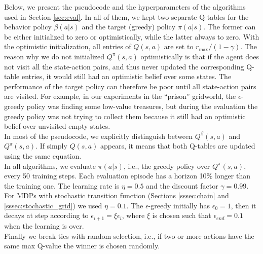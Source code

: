\documentclass{article}
\begin{document}
Below, we present the pseudocode and the hyperparameters of the algorithms used in Section \ref{sec:eval}. In all of them, we kept two separate Q-tables for the behavior policy $\beta(a|s)$ and the target (greedy) policy $\pi(a|s)$. The former can be either initialized to zero or optimistically, while the latter always to zero. 
With the optimistic initialization, all entries of ${Q}(s,a)$ are set to $r_{\max} / (1 - \gamma)$.
The reason why we do not initialized $Q^\pi(s,a)$ optimistically is that if the agent does not visit all the state-action pairs, and thus never updated the corresponding Q-table entries, it would still had an optimistic belief over some states. The performance of the target policy can therefore be poor until all state-action pairs are visited.
For example, in our experiments in the ``prison'' gridworld, the $\epsilon$-greedy policy was finding some low-value treasures, but during the evaluation the greedy policy was not trying to collect them because it still had an optimistic belief over unvisited empty states. 
\\
In most of the pseudocode, we explicitly distinguish between $Q^\beta(s,a)$ and $Q^\pi(s,a)$. If simply $Q(s,a)$ appears, it means that both Q-tables are updated using the same equation.
\\
In all algorithms, we evaluate $\pi(a|s)$, i.e., the greedy policy over $Q^\pi(s,a)$, every 50 training steps. Each evaluation episode has a horizon 10\% longer than the training one. The learning rate is $\eta = 0.5$ and the discount factor $\gamma = 0.99$. For MDPs with stochastic transition function (Sections \ref{sssec:chain} and \ref{sssec:stochastic_grid}) we used $\eta = 0.1$. 
The $\epsilon$-greedy initially has $\epsilon_0 = 1$, then it decays at step according to $\epsilon_{i+1} = \xi\epsilon_{i}$, where $\xi$ is chosen such that $\epsilon_{end} = 0.1$ when the learning is over.
\\
Finally we break ties with random selection, i.e., if two or more actions have the same max Q-value the winner is chosen randomly.
\end{document}

